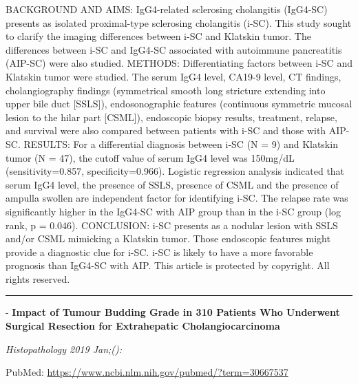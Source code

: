 \documentclass[]{article}
\begin{document}
BACKGROUND AND AIMS: IgG4-related sclerosing cholangitis (IgG4-SC)
presents as isolated proximal-type sclerosing cholangitis (i-SC). This
study sought to clarify the imaging differences between i-SC and
Klatskin tumor. The differences between i-SC and IgG4-SC associated with
autoimmune pancreatitis (AIP-SC) were also studied. METHODS:
Differentiating factors between i-SC and Klatskin tumor were studied.
The serum IgG4 level, CA19-9 level, CT findings, cholangiography
findings (symmetrical smooth long stricture extending into upper bile
duct {[}SSLS{]}), endosonographic features (continuous symmetric mucosal
lesion to the hilar part {[}CSML{]}), endoscopic biopsy results,
treatment, relapse, and survival were also compared between patients
with i-SC and those with AIP-SC. RESULTS: For a differential diagnosis
between i-SC (N = 9) and Klatskin tumor (N = 47), the cutoff value of
serum IgG4 level was 150mg/dL (sensitivity=0.857, specificity=0.966).
Logistic regression analysis indicated that serum IgG4 level, the
presence of SSLS, presence of CSML and the presence of ampulla swollen
are independent factor for identifying i-SC. The relapse rate was
significantly higher in the IgG4-SC with AIP group than in the i-SC
group (log rank, p = 0.046). CONCLUSION: i-SC presents as a nodular
lesion with SSLS and/or CSML mimicking a Klatskin tumor. Those
endoscopic features might provide a diagnostic clue for i-SC. i-SC is
likely to have a more favorable prognosis than IgG4-SC with AIP. This
article is protected by copyright. All rights reserved.

{}

{}

\begin{center}\rule{0.5\linewidth}{\linethickness}\end{center}

 - \textbf{Impact of Tumour Budding Grade in 310 Patients Who Underwent
Surgical Resection for Extrahepatic Cholangiocarcinoma}

\emph{Histopathology 2019 Jan;():}

PubMed: \url{https://www.ncbi.nlm.nih.gov/pubmed/?term=30667537}
\end{document}

